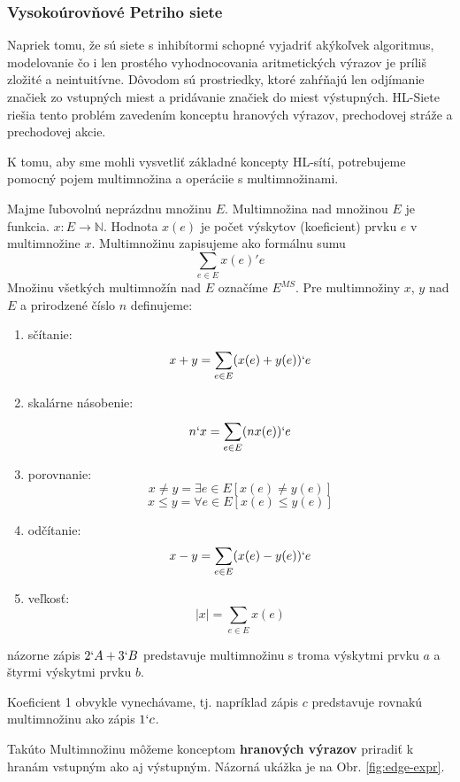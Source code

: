 \subsubsection{Vysokoúrovňové Petriho siete}
Napriek tomu, že sú siete s inhibítormi schopné vyjadriť akýkoľvek algoritmus, modelovanie čo i len prostého vyhodnocovania aritmetických výrazov je príliš zložité a neintuitívne. Dôvodom sú prostriedky, ktoré zahŕňajú len odjímanie značiek zo vstupných miest a pridávanie značiek do miest výstupných. HL-Siete riešia tento problém zavedením konceptu hranových výrazov, prechodovej stráže a prechodovej akcie.

K tomu, aby sme mohli vysvetliť základné koncepty HL-sítí, potrebujeme pomocný pojem multimnožina a operáciie s multimnožinami.
\begin{defn}
	Majme ľubovolnú neprázdnu množinu $E$. Multimnožina nad množinou $E$ je funkcia. $x : E \longrightarrow \mathbb{N}$. Hodnota $x(e)$ je počet výskytov (koeficient) prvku $e$ v multimnožine $x$. Multimnožinu zapisujeme ako formálnu sumu 
	$$ \sum_{e \in E} x(e)'e $$
	Množinu všetkých multimnožín nad $E$ označíme $E^{MS}$. Pre multimnožiny $x$, $y$ nad $E$ a prirodzené číslo $n$ definujeme:
	
	\begin{enumerate}
		\item sčítanie: $$x + y = \sum_{e \in E} (x(e) + y (e))`e$$
		\item skalárne násobenie: $$n`x = \sum_{e \in E}^{} (n x(e))`e$$
		\item porovnanie:
		$$ x \neq y = \exists e \in E [x(e) \neq y(e) ]$$
		$$ x \leq y = \forall e \in E [x(e) \leq y(e) ]$$
		\item odčítanie: $$x - y = \sum_{e \in E} (x(e) - y (e))`e$$
		\item veľkosť: $$|x| = \sum_{e \in E} x(e)$$
	\end{enumerate}
\end{defn}

\begin{exmpl}
	názorne zápis $2`A + 3`B$ predstavuje multimnožinu s troma výskytmi prvku $a$ a štyrmi výskytmi prvku $b$.
\end{exmpl}

\begin{note}
	Koeficient 1 obvykle vynechávame, tj. napríklad zápis $c$ predstavuje rovnakú multimnožinu ako zápis $1`c$.
\end{note}

Takúto Multimnožinu môžeme konceptom \textbf{hranových výrazov} priradiť k hranám vstupným ako aj výstupným. Názorná ukážka je na Obr. \ref{fig:edge-expr}.

